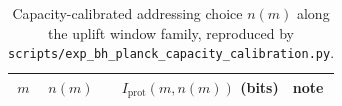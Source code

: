 \begin{table}[t]
\centering
\scriptsize
\setlength{\tabcolsep}{6pt}
\renewcommand{\arraystretch}{1.15}
\begin{tabular}{r r r l}
\toprule
$m$ & $n(m)$ & $I_{\mathrm{prot}}(m,n(m))$ (bits) & note \\
\midrule
%
\end{tabular}
\caption{Capacity-calibrated addressing choice $n(m)$ along the uplift window family, reproduced by \texttt{scripts/exp\_bh\_planck\_capacity\_calibration.py}.}
\label{tab:mass_flow_capacity_calibrated_uplift_path}
\end{table}


